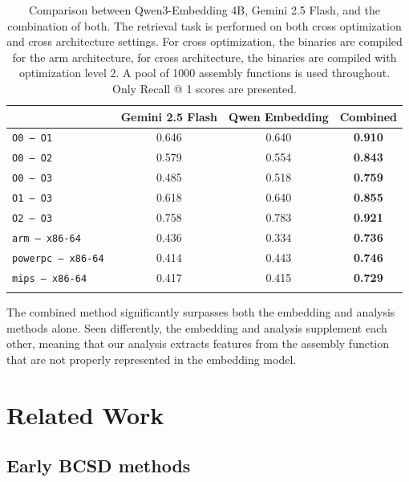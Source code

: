 {
\renewcommand{\arraystretch}{1.1}
\begin{table}[tb]
\centering
\begin{tabular}{l|c|c|c}
\Xhline{2\arrayrulewidth}
                       & Gemini 2.5 Flash & Qwen Embedding & Combined  \\ \hline
\tt O0 -- O1           & 0.646            & 0.640          & \bf 0.910 \\
\tt O0 -- O2           & 0.579            & 0.554          & \bf 0.843 \\
\tt O0 -- O3           & 0.485            & 0.518          & \bf 0.759 \\
\tt O1 -- O3           & 0.618            & 0.640          & \bf 0.855 \\
\tt O2 -- O3           & 0.758            & 0.783          & \bf 0.921 \\
\tt arm -- x86-64      & 0.436            & 0.334          & \bf 0.736 \\
\tt powerpc -- x86-64  & 0.414            & 0.443          & \bf 0.746 \\
\tt mips -- x86-64     & 0.417            & 0.415          & \bf 0.729 \\ \Xhline{2\arrayrulewidth}
\end{tabular}
\caption{Comparison between Qwen3-Embedding 4B, Gemini 2.5 Flash, and the combination of both. The retrieval task is performed on both cross
optimization and cross architecture settings. For cross optimization, the binaries are compiled for the arm architecture, for cross architecture,
the binaries are compiled with optimization level 2. A pool of 1000 assembly functions is used throughout. Only Recall @ 1 scores are presented.}
\label{composite}
\end{table}
}

The combined method significantly surpasses both the embedding and analysis methods alone. Seen differently, the embedding and analysis supplement
each other, meaning that our analysis extracts features from the assembly function that are not properly represented in the embedding model.

\section{Related Work}
\label{related-work}

\subsection{Early BCSD methods}

